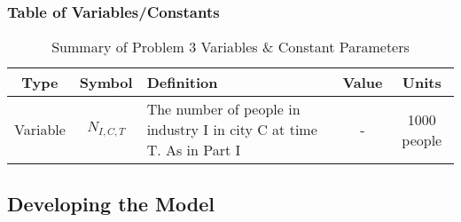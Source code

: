            \subsubsection{Table of Variables/Constants}
                \begin{table}[h!]
                  \begin{center}
                    \label{tab:variables3} %
                    \begin{tabular}{|c|c|p{5cm}|c|c|} %
                      \toprule 
                       \textbf{Type} & \textbf{Symbol} & \textbf{Definition} & \textbf{Value} & \textbf{Units} \\
                      \midrule 
                      Variable & $N_{I,C,T}$ & The number of people in industry I in city C at time T. As in Part I & - & 1000 people  \\ %
                      \bottomrule 
                    \end{tabular}
                    \caption{Summary of Problem 3 Variables \& Constant Parameters}                
                  \end{center}
                \end{table}
            

            
        \subsection{Developing the Model}  

